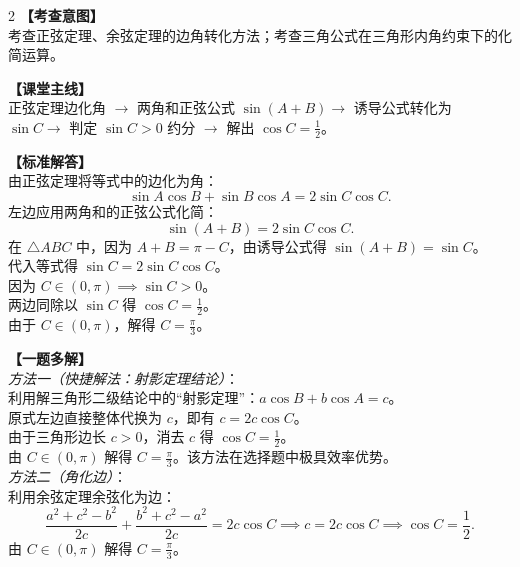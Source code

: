 \documentclass[11pt,a4paper]{ctexart}
\begin{document}
\vspace{0.8em}
\par{}
\vspace{0.8em}

\newpage


\qTwoStem
\qTwoOptions

\vspace{0.8em}

\begin{paracol}{2}
  \textbf{【考查意图】}\\
  考查正弦定理、余弦定理的边角转化方法；考查三角公式在三角形内角约束下的化简运算。
  
  \textbf{【课堂主线】}\\
  正弦定理边化角 $\to$ 两角和正弦公式 $\sin(A+B) \to$ 诱导公式转化为 $\sin C \to$ 判定 $\sin C > 0$ 约分 $\to$ 解出 $\cos C = \frac{1}{2}$。
  
  \textbf{【标准解答】}\\
  由正弦定理将等式中的边化为角：
  \[
  \sin A \cos B + \sin B \cos A = 2 \sin C \cos C.
  \]
  左边应用两角和的正弦公式化简：
  \[
  \sin(A+B) = 2 \sin C \cos C.
  \]
  在 $\triangle ABC$ 中，因为 $A+B = \pi - C$，由诱导公式得 $\sin(A+B) = \sin C$。\\
  代入等式得 $\sin C = 2 \sin C \cos C$。\\
  因为 $C \in (0, \pi) \implies \sin C > 0$。\\
  两边同除以 $\sin C$ 得 $\cos C = \frac{1}{2}$。\\
  由于 $C \in (0, \pi)$，解得 $C = \frac{\pi}{3}$。
  
  \textbf{【一题多解】}\\
  \textit{方法一（快捷解法：射影定理结论）}：\\
  利用解三角形二级结论中的“射影定理”：$a\cos B + b\cos A = c$。\\
  原式左边直接整体代换为 $c$，即有 $c = 2c\cos C$。\\
  由于三角形边长 $c > 0$，消去 $c$ 得 $\cos C = \frac{1}{2}$。\\
  由 $C \in (0, \pi)$ 解得 $C = \frac{\pi}{3}$。该方法在选择题中极具效率优势。\\
  \textit{方法二（角化边）}：\\
  利用余弦定理余弦化为边：
  \[
  \frac{a^2+c^2-b^2}{2c} + \frac{b^2+c^2-a^2}{2c} = 2c \cos C \implies c = 2c \cos C \implies \cos C = \frac{1}{2}.
  \]
  由 $C \in (0, \pi)$ 解得 $C = \frac{\pi}{3}$。


\end{paracol}
\end{document}
